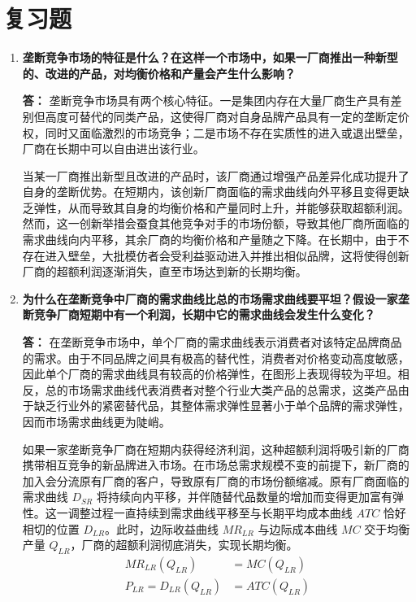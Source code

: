 	\section{复习题}
	\begin{enumerate}[label=\textbf{\arabic*.}, leftmargin=*]
		\item \textbf{垄断竞争市场的特征是什么？在这样一个市场中，如果一厂商推出一种新型的、改进的产品，对均衡价格和产量会产生什么影响？}
		
		\textbf{答：}
		垄断竞争市场具有两个核心特征。一是集团内存在大量厂商生产具有差别但高度可替代的同类产品，这使得厂商对自身品牌产品具有一定的垄断定价权，同时又面临激烈的市场竞争；二是市场不存在实质性的进入或退出壁垒，厂商在长期中可以自由进出该行业。
		
		当某一厂商推出新型且改进的产品时，该厂商通过增强产品差异化成功提升了自身的垄断优势。在短期内，该创新厂商面临的需求曲线向外平移且变得更缺乏弹性，从而导致其自身的均衡价格和产量同时上升，并能够获取超额利润。然而，这一创新举措会蚕食其他竞争对手的市场份额，导致其他厂商所面临的需求曲线向内平移，其余厂商的均衡价格和产量随之下降。在长期中，由于不存在进入壁垒，大批模仿者会受利益驱动进入并推出相似品牌，这将使得创新厂商的超额利润逐渐消失，直至市场达到新的长期均衡。
		
		\item \textbf{为什么在垄断竞争中厂商的需求曲线比总的市场需求曲线要平坦？假设一家垄断竞争厂商短期中有一个利润，长期中它的需求曲线会发生什么变化？}
		
		\textbf{答：}
		在垄断竞争市场中，单个厂商的需求曲线表示消费者对该特定品牌商品的需求。由于不同品牌之间具有极高的替代性，消费者对价格变动高度敏感，因此单个厂商的需求曲线具有较高的价格弹性，在图形上表现得较为平坦。相反，总的市场需求曲线代表消费者对整个行业大类产品的总需求，这类产品由于缺乏行业外的紧密替代品，其整体需求弹性显著小于单个品牌的需求弹性，因而市场需求曲线更为陡峭。
		
		如果一家垄断竞争厂商在短期内获得经济利润，这种超额利润将吸引新的厂商携带相互竞争的新品牌进入市场。在市场总需求规模不变的前提下，新厂商的加入会分流原有厂商的客户，导致原有厂商的市场份额缩减。原有厂商面临的需求曲线 $D_{SR}$ 将持续向内平移，并伴随替代品数量的增加而变得更加富有弹性。这一调整过程一直持续到需求曲线平移至与长期平均成本曲线 $ATC$ 恰好相切的位置 $D_{LR}$。此时，边际收益曲线 $MR_{LR}$ 与边际成本曲线 $MC$ 交于均衡产量 $Q_{LR}$，厂商的超额利润彻底消失，实现长期均衡。
		\[
		\begin{aligned}
			MR_{LR}(Q_{LR}) &= MC(Q_{LR}) \\
			P_{LR} = D_{LR}(Q_{LR}) &= ATC(Q_{LR})
		\end{aligned}
		\]
		

\end{enumerate}
